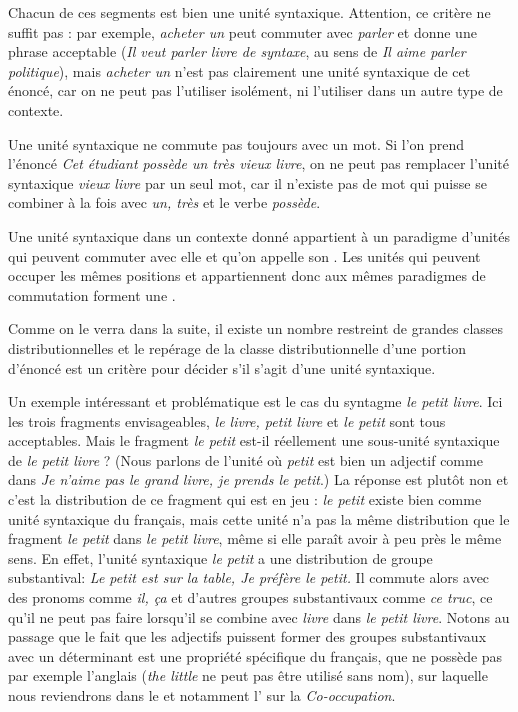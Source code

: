 Chacun de ces segments est bien une unité syntaxique. Attention, ce critère ne suffit pas : par exemple, \textit{acheter un} peut commuter avec \textit{parler} et donne une phrase acceptable (\textit{Il veut parler livre de syntaxe}, au sens de \textit{Il aime parler politique}), mais \textit{acheter un} n’est pas clairement une unité syntaxique de cet énoncé, car on ne peut pas l’utiliser isolément, ni l’utiliser dans un autre type de contexte.

Une unité syntaxique ne commute pas toujours avec un mot. Si l’on prend l’énoncé \textit{Cet étudiant possède un très vieux livre}, on ne peut pas remplacer l’unité syntaxique \textit{vieux livre} par un seul mot, car il n’existe pas de mot qui puisse se combiner à la fois avec \textit{un, très} et le verbe \textit{possède}.

\begin{styleLivreImportant}
Une unité syntaxique dans un contexte donné appartient à un paradigme d’unités qui peuvent commuter avec elle et qu’on appelle son . Les unités qui peuvent occuper les mêmes positions et appartiennent donc aux mêmes paradigmes de commutation forment une .
\end{styleLivreImportant}

Comme on le verra dans la suite, il existe un nombre restreint de grandes classes distributionnelles et le repérage de la classe distributionnelle d’une portion d’énoncé est un critère pour décider s’il s’agit d’une unité syntaxique.

Un exemple intéressant et problématique est le cas du syntagme \textit{le petit livre}. Ici les trois fragments envisageables, \textit{le livre, petit livre} et \textit{le petit} sont tous acceptables. Mais le fragment \textit{le petit} est-il réellement une sous-unité syntaxique de \textit{le petit livre} ? (Nous parlons de l’unité où \textit{petit} est bien un adjectif comme dans \textit{Je n’aime pas le grand livre, je prends le petit}.) La réponse est plutôt non et c’est la distribution de ce fragment qui est en jeu : \textit{le petit} existe bien comme unité syntaxique du français, mais cette unité n’a pas la même distribution que le fragment \textit{le petit} dans \textit{le petit livre}, même si elle paraît avoir à peu près le même sens. En effet, l’unité syntaxique \textit{le petit} a une distribution de groupe substantival: \textit{Le petit est sur la table, Je préfère le petit.} Il commute alors avec des pronoms comme \textit{il, ça} et d’autres groupes substantivaux comme \textit{ce truc}, ce qu’il ne peut pas faire lorsqu’il se combine avec \textit{livre} dans \textit{le petit livre}. Notons au passage que le fait que les adjectifs puissent former des groupes substantivaux avec un déterminant est une propriété spécifique du français, que ne possède pas par exemple l’anglais (\textit{the little} ne peut pas être utilisé sans nom), sur laquelle nous reviendrons dans le  et notamment l’ sur la \textit{Co-occupation}.

